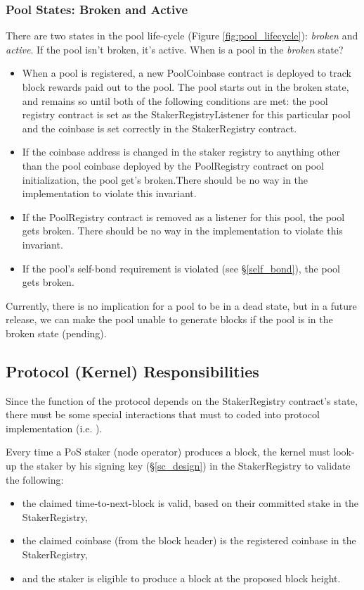 \subsubsection{Pool States: Broken and Active} \label{pool_states}

There are two states in the pool life-cycle (Figure \ref{fig:pool_lifecycle}): \textit{broken} and \textit{active}. If the pool isn't broken, it's active. When is a pool in the \textit{broken} state?
\begin{itemize}
    \item When a pool is registered, a new PoolCoinbase contract is deployed to track block rewards paid out to the pool. The pool starts out in the broken state, and remains so until both of the following conditions are met: the pool registry contract is set as the StakerRegistryListener for this particular pool and the coinbase is set correctly in the StakerRegistry contract. 
    \item If the coinbase address is changed in the staker registry to anything other than the pool coinbase deployed by the PoolRegistry contract on pool initialization, the pool get's broken.There should be no way in the implementation to violate this invariant. 
    \item If the PoolRegistry contract is removed as a listener for this pool, the pool gets broken. There should be no way in the implementation to violate this invariant.
    \item If the pool's self-bond requirement is violated (see \S\ref{self_bond}), the pool gets broken.
\end{itemize}

Currently, there is no implication for a pool to be in a dead state, but in a future release, we can make the pool unable to generate blocks if the pool is in the broken state (pending).

\subsection{Protocol (Kernel) Responsibilities}
Since the function of the protocol depends on the StakerRegistry contract's state, there must be some special interactions that must to coded into protocol implementation (i.e. ). 

Every time a PoS staker (node operator) produces a block, the kernel must look-up the staker by his signing key (\S\ref{sc_design}) in the StakerRegistry to validate the following:
\begin{itemize}[label=--,nosep]
    \item the claimed time-to-next-block is valid, based on their committed stake in the StakerRegistry,
    \item the claimed coinbase (from the block header) is the registered coinbase in the StakerRegistry,
    \item and the staker is eligible to produce a block at the proposed block height. 
\end{itemize}
